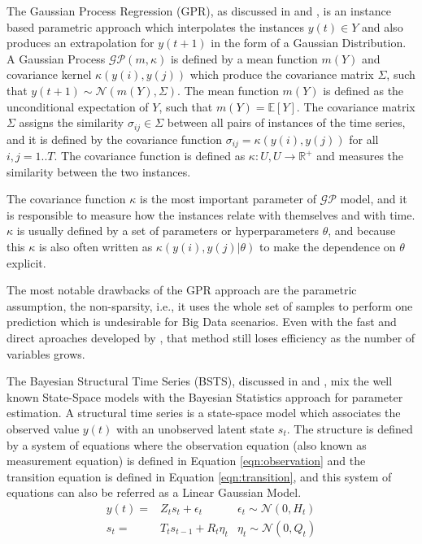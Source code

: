 
The Gaussian Process Regression (GPR), as discussed in \cite{Rasmussen2006} and \cite{Roberts2013}, is an instance based parametric approach which interpolates the instances $y(t) \in Y$ and also produces an extrapolation for $y(t+1)$ in the form of a Gaussian Distribution. A Gaussian Process $\mathcal{GP}(m,\kappa)$ is defined by a mean function $m(Y)$ and covariance kernel $\kappa(y(i),y(j))$ which produce the covariance matrix $\Sigma$, such that $y(t+1) \sim \mathcal{N}(m(Y),\Sigma)$. The mean function $m(Y)$ is defined as the unconditional expectation of $Y$, such that $m(Y) = \mathbb{E}[Y]$. The covariance matrix $\Sigma$ assigns the similarity $\sigma_{ij} \in \Sigma$ between all pairs of instances of the time series, and it is defined by the covariance function $\sigma_{ij} = \kappa(y(i),y(j))$ for all $i,j = 1..T$. The covariance function is defined as $\kappa: U,U \rightarrow \mathbb{R}^+$ and measures the similarity between the two instances. 

The covariance function $\kappa$ is the most important parameter of $\mathcal{GP}$ model, and it is responsible to measure how the instances relate with themselves and with time. $\kappa$ is usually defined by a set of parameters or hyperparameters $\theta$, and because this $\kappa$ is also often written as $\kappa(y(i),y(j)|\theta)$ to make the dependence on $\theta$ explicit. 

The most notable drawbacks of the GPR approach are the parametric assumption, the non-sparsity, i.e., it uses the whole set of samples to perform one prediction which is undesirable for Big Data scenarios. Even with the fast and direct aproaches developed by \cite{Ambikasaran2014}, that method still loses efficiency as the number of variables grows.


The Bayesian Structural Time Series (BSTS), discussed in \cite{Scott2014} and \cite{Barber2011a}, mix the well known State-Space models with the Bayesian Statistics approach for parameter estimation. A structural time series is a state-space model which associates the observed value $y(t)$ with an unobserved latent state  $s_t$. The structure is defined by a system of equations where the observation equation (also known as measurement equation) is defined in Equation \eqref{eqn:observation} and the transition equation is defined in Equation \eqref{eqn:transition}, and this system of equations can also be referred as a Linear Gaussian Model. 
\begin{align}
    y(t)  = & Z_ts_t + \epsilon_t & \epsilon_t \sim \mathcal{N}(0, H_t) \label{eqn:observation} \\
    s_t  = & T_t s_{t-1} + R_t\eta_t & \eta_t \sim \mathcal{N}(0, Q_t)  \label{eqn:transition}
\end{align}

